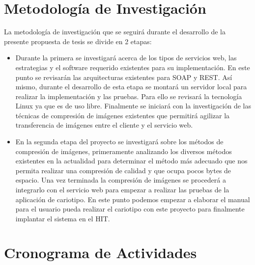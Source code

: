 \documentclass[12pt,letterpaper,titlepage]{article}
\begin{document}
\section{Metodología de Investigación}\label{metodo}

La metodología de investigación que se seguirá durante el desarrollo de la presente propuesta de tesis se divide en 2 etapas:

\begin{itemize}
\item Durante la primera se investigará acerca de los tipos de servicios web, las estrategias y el software requerido existentes para su implementación. En este punto se revisarán las arquitecturas existentes para SOAP y REST. Así mismo, durante el desarrollo de esta etapa se montará un servidor local para realizar la implementación y las pruebas. Para ello se revisará la tecnología Linux ya que es de uso libre. Finalmente se iniciará con la investigación de las técnicas de compresión de imágenes existentes que permitirá agilizar la transferencia de imágenes entre el cliente y el servicio web.\\

\item En la segunda etapa del proyecto se investigará sobre los métodos de compresión de imágenes, primeramente analizando los diversos métodos  existentes en la actualidad para determinar el método más adecuado que nos permita realizar una compresión de calidad y que ocupa pocos bytes de espacio. Una vez terminada la compresión de imágenes se procederá a integrarlo con el servicio web para empezar a realizar las pruebas de la aplicación de cariotipo. En este punto podemos empezar a elaborar el manual para el usuario pueda realizar el cariotipo con este proyecto para finalmente implantar el sistema en el HIT.\\

\end{itemize}



\section{Cronograma de Actividades}\label{cronograma}
\end{document}
